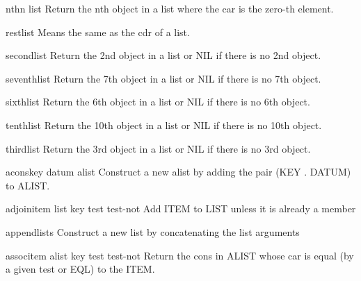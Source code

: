 \begin{accessor}{nth}{n list}{}{}
  Return the nth object in a list where the car is the zero-th element.
\end{accessor}

\begin{accessor}{rest}{list}{}{}
  Means the same as the cdr of a list.
\end{accessor}

\begin{accessor}{second}{list}{}{}
  Return the 2nd object in a list or NIL if there is no 2nd object.
\end{accessor}

\begin{accessor}{seventh}{list}{}{}
  Return the 7th object in a list or NIL if there is no 7th object.
\end{accessor}

\begin{accessor}{sixth}{list}{}{}
  Return the 6th object in a list or NIL if there is no 6th object.
\end{accessor}

\begin{accessor}{tenth}{list}{}{}
  Return the 10th object in a list or NIL if there is no 10th object.
\end{accessor}

\begin{accessor}{third}{list}{}{}
  Return the 3rd object in a list or NIL if there is no 3rd object.
\end{accessor}

\begin{function}{acons}{key datum alist}{}{}
  Construct a new alist by adding the pair (KEY . DATUM) to ALIST.
\end{function}

\begin{function}{adjoin}{item list \key key test test-not}{}{}
  Add ITEM to LIST unless it is already a member
\end{function}

\begin{function}{append}{\rest lists}{}{}
  Construct a new list by concatenating the list arguments
\end{function}

\begin{function}{assoc}{item alist \key key test test-not}{}{}
  Return the cons in ALIST whose car is equal (by a given test or EQL) to
   the ITEM.
\end{function}

